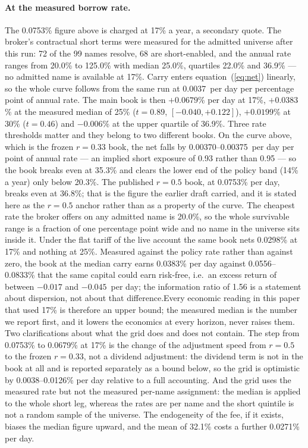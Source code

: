 \paragraph{At the measured borrow rate.} The 0.0753\% figure above is charged at 17\% a year, a secondary quote. The broker's contractual short terms were measured for the admitted universe after this run: 72 of the 99 names resolve, 68 are short-enabled, and the annual rate ranges from 20.0\% to 125.0\% with median 25.0\%, quartiles 22.0\% and 36.9\% --- no admitted name is available at 17\%. Carry enters equation~(\ref{eq:net}) linearly, so the whole curve follows from the same run at 0.0037\pp\ per day per percentage point of annual rate. The main book is then $+0.0679$\% per day at 17\%, $+0.0383$\% at the measured median of 25\% ($t=0.89$, $[-0.040,+0.122]$), $+0.0199$\% at 30\% ($t=0.46$) and $-0.006$\% at the upper quartile of 36.9\%. Three rate thresholds matter and they belong to two different books. On the curve above, which is the frozen $r=0.33$ book, the net falls by 0.00370--0.00375\pp\ per day per point of annual rate --- an implied short exposure of 0.93 rather than 0.95 --- so the book breaks even at 35.3\% and clears the lower end of the policy band (14\% a year) only below 20.3\%. The published $r=0.5$ book, at 0.0753\% per day, breaks even at 36.8\%; that is the figure the earlier draft carried, and it is stated here as the $r=0.5$ anchor rather than as a property of the curve. The cheapest rate the broker offers on any admitted name is 20.0\%, so the whole survivable range is a fraction of one percentage point wide and no name in the universe sits inside it. Under the flat tariff of the live account the same book nets 0.0298\% at 17\% and nothing at 25\%. Measured against the policy rate rather than against zero, the book at the median carry earns 0.0383\% per day against 0.0556--0.0833\% that the same capital could earn risk-free, i.e.\ an excess return of between $-0.017$ and $-0.045$\pp\ per day; the information ratio of 1.56 is a statement about dispersion, not about that difference.Every economic reading in this paper that used 17\% is therefore an upper bound; the measured median is the number we report first, and it lowers the economics at every horizon, never raises them. Two clarifications about what the grid does and does not contain. The step from 0.0753\% to 0.0679\% at 17\% is the change of the adjustment speed from $r=0.5$ to the frozen $r=0.33$, not a dividend adjustment: the dividend term is not in the book at all and is reported separately as a bound below, so the grid is optimistic by 0.0038--0.0126\% per day relative to a full accounting. And the grid uses the measured rate but not the measured per-name assignment: the median is applied to the whole short leg, whereas the rates are per name and the short quintile is not a random sample of the universe. The endogeneity of the fee, if it exists, biases the median figure upward, and the mean of 32.1\% costs a further 0.0271\% per day.

